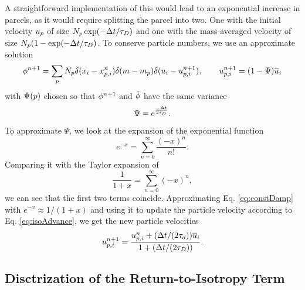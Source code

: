 A straightforward implementation of this would lead to an exponential increase in parcels, as it would require splitting the parcel into two. One with the initial velocity $u_p$ of size $N_p \operatorname{exp}(-\Delta t/ \tau_D)$ and one with the mass-averaged velocity of size $N_p (1-\operatorname{exp}(-\Delta t / \tau_D)$.
To conserve particle numbers, we use an approximate solution
\begin{align}
\label{eq:isoAdvance}
    \phi^{n+1} =\sum_p N_p \delta (x_i - x_{p,i}^n) \delta (m - m_p) \delta(u_i - u_{p,i}^{n+1}), \qquad u_{p,i}^{n+1}= (1-\Psi) \overline{u}_i
\end{align}
with $\Psi(p)$ chosen so that $\phi^{n+1}$ and $\tilde{\phi}$ have the same variance
\begin{equation}
\label{eq:constDamp}
    \Psi = e^{\frac{-\Delta t}{2 \tau_D}}.
\end{equation}
To approximate $\Psi$, we look at the expansion of the exponential function
\begin{equation}
    e^{-x} = \sum_{n=0}^{\infty} \dfrac{(-x)^n}{n!}.
\end{equation}
Comparing it with the Taylor expansion of
\begin{equation}
    \dfrac{1}{1+x} = \sum_{n=0}^{\infty} (-x)^n,
\end{equation}
we can see that the first two terms coincide.
Approximating Eq. \eqref{eq:constDamp} with $e^{-x} \approx 1/(1+x)$ and using it to update the particle velocity according to Eq. \eqref{eq:isoAdvance}, we get the new particle velocities
\begin{equation}
    u_{p,i}^{n+1} = \dfrac{u_{p,i}^{n} + (\Delta t/ (2 \tau_d)) \overline{u}_i}{1+ (\Delta t / (2 \tau_D))}.
\end{equation}



\subsection{Disctrization of the Return-to-Isotropy Term}

